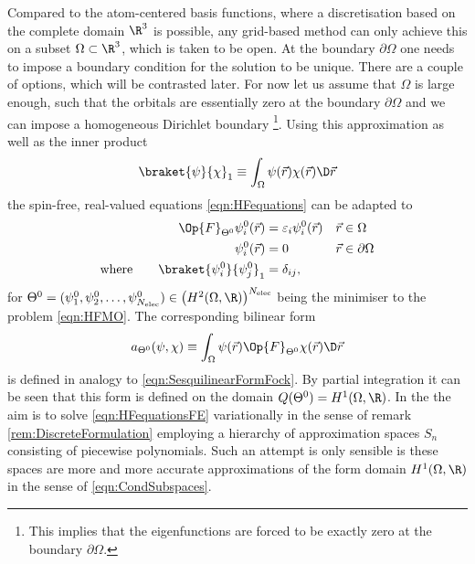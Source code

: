 Compared to the atom-centered basis functions,
where a discretisation based on the complete domain $\R^3$ is possible,
any grid-based method can only achieve this
on a subset $\Omega \subset \R^3$,
which is taken to be open.
At the boundary $\partial\Omega$ one needs
to impose a boundary condition for the solution to be unique.
There are a couple of options, which will be contrasted later.
For now let us assume that $\Omega$ is large enough,
such that the \SCF orbitals are essentially zero at the boundary $\partial\Omega$
and we can impose a homogeneous Dirichlet boundary%
\footnote{This implies that the \HF eigenfunctions are forced
	to be exactly zero at the boundary $\partial\Omega$.}.
Using this approximation
as well as the inner product
\[ \braket{\psi}{\chi}_1 \equiv \int_\Omega \psi(\vec{r}) \chi(\vec{r})  \D \vec{r} \]
the spin-free, real-valued \HF equations \eqref{eqn:HFequations} can be adapted to
%
\begin{equation}
\label{eqn:HFequationsFE}
\begin{aligned}
	\Op{F}_{\Theta^0} \psi_i^0(\vec{r}) &= \varepsilon_i \psi_i^0(\vec{r}) && \vec{r} \in \Omega \\
	\psi_i^0(\vec{r}) &=0 &&\vec{r} \in \partial \Omega \\
	\text{where}\qquad \braket{\psi_i^0}{\psi_j^0}_1 &= \delta_{ij},
\end{aligned}
\end{equation}
for $\Theta^0 = (\psi_1^0, \psi_2^0, \ldots, \psi_{\Nelec}^0) \in \left( H^2(\Omega,\R) \right)^{\Nelec}$
being the minimiser to the \HF problem \eqref{eqn:HFMO}.
The corresponding bilinear form
\[ a_{\Theta^0}(\psi, \chi)
	\equiv \int_\Omega \psi(\vec{r}) \Op{F}_{\Theta^0} \chi(\vec{r}) \D \vec{r} \]
is defined in analogy to \eqref{eqn:SesquilinearFormFock}.
By partial integration it can be seen that this form
is defined on the domain $Q(\Theta^0) = H^1(\Omega, \R)$.
In the 
the aim is to solve \eqref{eqn:HFequationsFE} variationally
in the sense of remark \vref{rem:DiscreteFormulation}
employing a hierarchy of approximation spaces $S_n$
consisting of piecewise polynomials.
Such an attempt is only sensible
is these spaces are more and more accurate
approximations of the form domain $H^1(\Omega, \R)$
in the sense of \eqref{eqn:CondSubspaces}.

